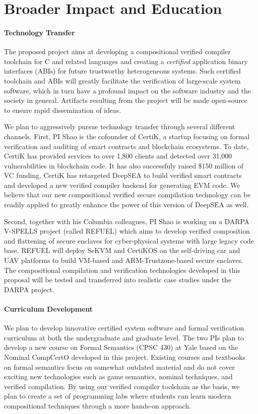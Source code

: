 \section{Broader Impact and Education}
\label{sec:impact}

\paragraph*{Technology Transfer}
The proposed project aims at developing a compositional verified
compiler toolchain for C and related languages and creating a {\em
  certified} application binary interfaces (ABIs) for future
trustworthy heterogeneous systems. Such certified toolchain and ABIs
will greatly facilitate the verification of large-scale system
software, which in turn have a profound impact on the software
industry and the society in general.
Artifacts resulting from the project will be
made open-source to ensure rapid dissemination of ideas.

We plan to aggressively pursue technology transfer through several
different channels. First, PI Shao is the cofounder of CertiK,
a startup focusing on formal verification and auditing of smart
contracts and blockchain ecosystems. To date,
CertiK has provided services to over 1,800 clients and detected
over 31,000 vulnerabilities in blockchain code. It has also
successfuly raised \$150 million of VC funding. CertiK has retargeted
DeepSEA to build verified smart contracts and developed a new
verified compiler backend for generating EVM code. We believe
that our new compositional verified secure compilation technology
can be readily applied to greatly enhance the power of this version
of DeepSEA as well.

Second, together with his Columbia colleagues, PI Shao is working on
a DARPA V-SPELLS project (called REFUEL)
which aims to develop verified composition and flattening of secure
enclaves for cyber-physical systems with large legacy code base.
REFUEL will deploy SeKVM and CertiKOS on the self-driving car
and UAV platforms to build VM-based and ARM-Trustzone-based secure
enclaves. The compositional compilation and verification technologies
developed in this proposal will be tested and transferred into realistic
case studies under the DARPA project.

\vspace*{-2ex}
\paragraph*{Curriculum Development}
We plan to develop innovative certified system software and formal
verification curriculum at both the undergraduate and graduate
level. The two PIs plan to develop a new course on Formal Semantics
(CPSC 430) at Yale based on the Nominal CompCertO developed in this
project. Existing courses and textbooks on formal semantics focus on
somewhat outdated material and do not cover exciting new technologies
such as game semantics, nominal techniques, and verified
compilation. By using our verified compiler toolchain as the basis, we
plan to create a set of programming labs where students can learn
modern compositional techniques through a more hands-on approach.

